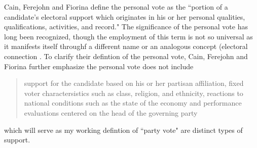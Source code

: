 \documentclass[hyphens, crop=false]{standalone}
\begin{document}
		
		Cain, Ferejohn and Fiorina
		\autocite*{cainPersonalVoteConstituency1987}
		define the personal vote as the ``portion of a candidate's electoral support which originates in his or her
		personal qualities,
		qualifications,
		activities,
		and record." 
		\autocite*[9]{cainPersonalVoteConstituency1987}
		The significance of the personal vote has long been recognized,
		though the employment of this term is not so universal as it manifests itself throughf a different name or an analogous concept
		(electoral connection
		\autocites[home style][]{fennoHomeStyleHouse1978}[electoral connection][]{mayhewCongressElectoralConnection1974}[personal reputation][]{careyIncentivesCultivatePersonal1995}[dyadic representation][]{millerConstituencyInfluenceCongress1963}{weissbergCollectiveVsDyadic1978}{ansolabehereDyadicRepresentation2011}[personal representation][]{colomerPersonalRepresentationNeglected2011}[local vote][]{pattieWinningLocalVote1995}.
		To clarify their defintion of the personal vote,
		Cain, Ferejohn and Fiorina
		\autocite*[9]{cainPersonalVoteConstituency1987}
		further emphasize the personal vote does not include
		\begin{quotation}
			support for the candidate based on his or her partisan affiliation, fixed voter charactersistics such as class, religion, and ethnicity, reactions to national conditions such as the state of the economy and performance evaluations centered on the head of the governing party
		\end{quotation}
		which will serve as my working defintion of ``party vote" are distinct types of support.
		
\end{document}
